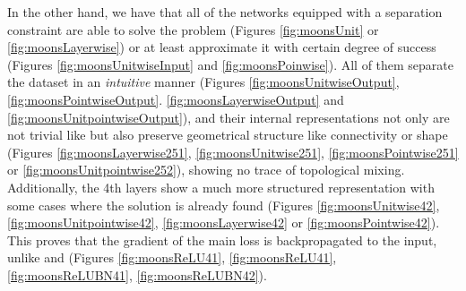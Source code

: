 In the other hand, we have that all of the \ReLU networks equipped with a separation constraint are able to solve the problem (Figures \ref{fig:moonsUnit} or \ref{fig:moonsLayerwise}) or at least approximate it with certain degree of success (Figures \ref{fig:moonsUnitwiseInput} and \ref{fig:moonsPoinwise}).
All of them separate the dataset in an \emph{intuitive} manner (Figures \ref{fig:moonsUnitwiseOutput}, \ref{fig:moonsPointwiseOutput}. \ref{fig:moonsLayerwiseOutput} and \ref{fig:moonsUnitpointwiseOutput}), and their internal representations not only are not trivial like \ReLUBN but also preserve geometrical structure like connectivity or shape (Figures \ref{fig:moonsLayerwise251}, \ref{fig:moonsUnitwise251}, \ref{fig:moonsPointwise251} or \ref{fig:moonsUnitpointwise252}), showing no trace of topological mixing. Additionally, the 4th layers show a much more structured representation with some cases where the solution is already found (Figures \ref{fig:moonsUnitwise42}, \ref{fig:moonsUnitpointwise42}, \ref{fig:moonsLayerwise42} or \ref{fig:moonsPointwise42}). This proves that the gradient of the main loss is backpropagated to the input, unlike \ReLU and \ReLUBN (Figures \ref{fig:moonsReLU41}, \ref{fig:moonsReLU41}, \ref{fig:moonsReLUBN41}, \ref{fig:moonsReLUBN42}).


